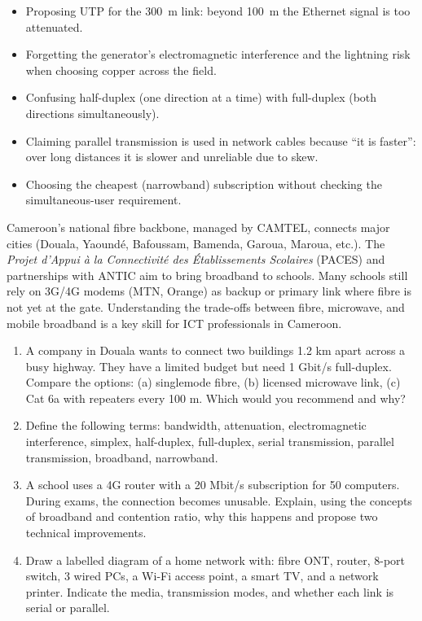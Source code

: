 \documentclass[11pt]{article}
\begin{document}
\begin{attention}
\begin{itemize}
\item Proposing UTP for the \SI{300}{m} link: beyond \SI{100}{m} the Ethernet signal is too attenuated.
\item Forgetting the generator's electromagnetic interference and the lightning risk when choosing copper across the field.
\item Confusing half-duplex (one direction at a time) with full-duplex (both directions simultaneously).
\item Claiming parallel transmission is used in network cables because ``it is faster'': over long distances it is slower and unreliable due to skew.
\item Choosing the cheapest (narrowband) subscription without checking the simultaneous-user requirement.
\end{itemize}
\end{attention}

\begin{savaistu}
Cameroon's national fibre backbone, managed by CAMTEL, connects major cities (Douala, Yaoundé, Bafoussam, Bamenda, Garoua, Maroua, etc.). The \emph{Projet d'Appui à la Connectivité des Établissements Scolaires} (PACES) and partnerships with ANTIC aim to bring broadband to schools. Many schools still rely on 3G/4G modems (MTN, Orange) as backup or primary link where fibre is not yet at the gate. Understanding the trade-offs between fibre, microwave, and mobile broadband is a key skill for ICT professionals in Cameroon.
\end{savaistu}

\begin{exercice}
\begin{enumerate}
\item A company in Douala wants to connect two buildings 1.2 km apart across a busy highway. They have a limited budget but need 1 Gbit/s full-duplex. Compare the options: (a) singlemode fibre, (b) licensed microwave link, (c) Cat 6a with repeaters every 100 m. Which would you recommend and why?
\item Define the following terms: bandwidth, attenuation, electromagnetic interference, simplex, half-duplex, full-duplex, serial transmission, parallel transmission, broadband, narrowband.
\item A school uses a 4G router with a 20 Mbit/s subscription for 50 computers. During exams, the connection becomes unusable. Explain, using the concepts of broadband and contention ratio, why this happens and propose two technical improvements.
\item Draw a labelled diagram of a home network with: fibre ONT, router, 8-port switch, 3 wired PCs, a Wi-Fi access point, a smart TV, and a network printer. Indicate the media, transmission modes, and whether each link is serial or parallel.
\end{enumerate}
\end{exercice}
\end{document}
